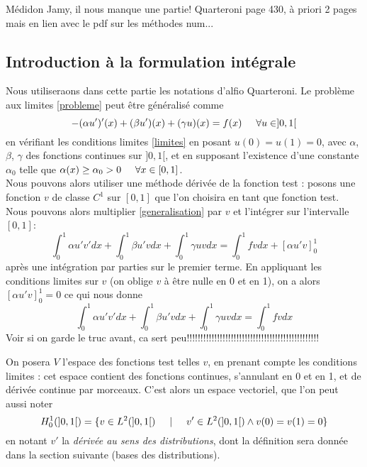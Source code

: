 \documentclass[12pt]{article}
\newcommand{\espace}{\hspace{5mm}}
\begin{document}
Médidon Jamy, il nous manque une partie!
Quarteroni page 430, à priori 2 pages mais en lien avec le pdf sur les méthodes num...


\subsection{Introduction à la formulation intégrale}

Nous utiliseraons dans cette partie les notations d'alfio Quarteroni. Le problème aux limites \eqref{probleme} peut être généralisé comme
\begin{equation} \label{generalisation}
-(\alpha u')'(x) + (\beta u')(x) + (\gamma u)(x) = f(x) \espace \forall u \in ]0,1[
\end{equation}
en vérifiant les conditions limites \eqref{limites} en posant $u(0) = u(1) = 0$, avec $\alpha$, $\beta$, $\gamma$ des fonctions continues sur $]0,1[$, et en supposant l'existence d'une constante $\alpha_0$ telle que $\alpha(x) \ge \alpha_0 > 0 \espace \forall x \in [0,1]$. \\
\quad Nous pouvons alors utiliser une méthode dérivée de la fonction test : posons une fonction $v$ de classe $C^1$ sur $[0,1]$ que l'on choisira en tant que fonction test. Nous pouvons alors multiplier \eqref{generalisation} par $v$ et l'intégrer sur l'intervalle $[0,1]$:
\begin{equation} \label{patéIntegrale}
\int_0^1 \alpha u' v' dx + \int_0^1 \beta u' v dx + \int_0^1 \gamma u v dx = \int_0^1 fv dx + [\alpha u' v]_0^1
\end{equation}
après une intégration par parties sur le premier terme. En appliquant les conditions limites sur $v$ (on oblige $v$ à être nulle en 0 et en 1), on a alors $[\alpha u' v]_0^1 = 0$ ce qui nous donne
\begin{equation}
\int_0^1 \alpha u' v' dx + \int_0^1 \beta u' v dx + \int_0^1 \gamma u v dx = \int_0^1 fv dx 
\end{equation}
Voir si on garde le truc avant, ca sert peu!!!!!!!!!!!!!!!!!!!!!!!!!!!!!!!!!!!!!!!!!!!!!!!!

On posera $V$ l'espace des fonctions test telles $v$, en prenant compte les conditions limites : cet espace contient des fonctions continues, s'annulant en 0 et en 1, et de dérivée continue par morceaux. C'est alors un espace vectoriel, que l'on peut aussi noter 
\begin{equation}
H_0^1(]0,1[) = \{v \in L^2(]0,1[) \espace | \espace v' \in L^2(]0,1[) \wedge v(0) = v(1) = 0\}
\end{equation}
en notant $v'$ la \emph{dérivée au sens des distributions}, dont la définition sera donnée dans la section suivante (bases des distributions).
\end{document}
